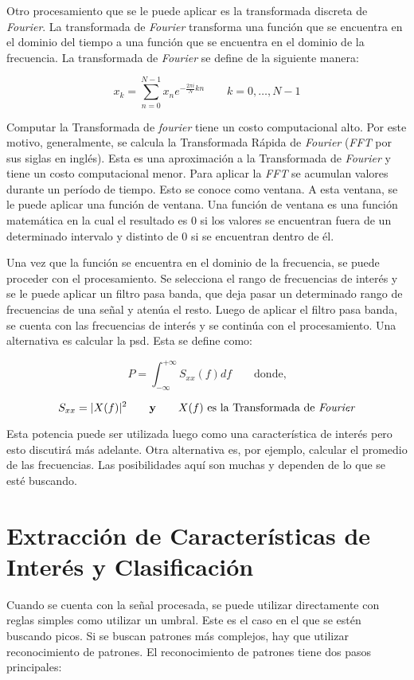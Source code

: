 Otro procesamiento que se le puede aplicar es la transformada discreta de \emph{Fourier}. La transformada de \emph{Fourier} transforma una función que se encuentra en el dominio del tiempo a una función que se encuentra en el dominio de la frecuencia. La transformada de \emph{Fourier} se define de la siguiente manera:

$$ x_{k} = \sum_{n=0}^{N-1} x_{n}e^{-\frac{2 \pi i}{N}kn} \qquad k = 0,\hdots, N - 1 $$

Computar la Transformada de \emph{fourier} tiene un costo computacional alto. Por este motivo, generalmente, se calcula la Transformada Rápida de \emph{Fourier} (\emph{FFT} por sus siglas en inglés). Esta es una aproximación a la Transformada de \emph{Fourier} y tiene un costo computacional menor. Para aplicar la \emph{FFT} se acumulan valores durante un período de tiempo. Esto se conoce como ventana. A esta ventana, se le puede aplicar una función de ventana. Una función de ventana es una función matemática en la cual el resultado es $0$ si los valores se encuentran fuera de un determinado intervalo y distinto de $0$ si se encuentran dentro de él. 

Una vez que la función se encuentra en el dominio de la frecuencia, se puede proceder con el procesamiento. Se selecciona el rango de frecuencias de interés y se le puede aplicar un filtro pasa banda, que deja pasar un determinado rango de frecuencias de una señal y atenúa el resto. Luego de aplicar el filtro pasa banda, se cuenta con las frecuencias de interés y se continúa con el procesamiento. Una alternativa es calcular la \acrshort{psd}. Esta se define como:

$$ P = \int_{-\infty}^{+\infty} S_{xx} (f) df \qquad  \textrm{donde,}$$

$$ S_{xx} = |X(f)|^{2} \qquad \textbf{y} \qquad X(f) \textrm{ es la Transformada de \emph{Fourier}} $$

Esta potencia puede ser utilizada luego como una característica de interés pero esto discutirá más adelante. Otra alternativa  es, por ejemplo, calcular el promedio de las frecuencias. Las posibilidades aquí son muchas y dependen de lo que se esté buscando.

\section{Extracción de Características de Interés y Clasificación} \label{sec:classification}

Cuando se cuenta con la señal procesada, se puede utilizar directamente con reglas simples como utilizar un umbral. Este es el caso en el que se estén buscando picos. Si se buscan patrones más complejos, hay que utilizar reconocimiento de patrones. El reconocimiento de patrones tiene dos pasos principales:

